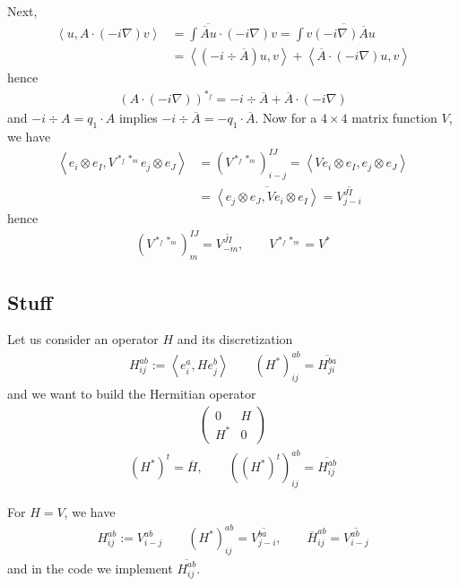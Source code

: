 \documentclass[11pt,a4paper,reqno,french,tikz]{amsart}
\newcommand{\pa}[1]{\left( #1 \right)} %
\newcommand{\ps}[1]{\left< #1 \right>} %
\newcommand{\na}{\nabla} %
\newcommand{\mat}[1]{\begin{pmatrix} #1 \end{pmatrix}} %
\begin{document}
Next, 
\begin{align*}
	\ps{u, A\cdot (-i\na) v} &= \int \overline{\overline{A}u} \cdot (-i\na)v = \int v \overline{(-i\na) \overline{A} u} \\
&= \ps{\pa{-i \div \overline{A}} u,v} + \ps{\overline{A}\cdot (-i\na) u,v}
\end{align*}
hence
\begin{align*}
\pa{A\cdot (-i\na)}^{*_f} = -i \div \overline{A} + \overline{A} \cdot(-i\na)
\end{align*}
and $-i \div A = q_1 \cdot A$ implies $-i\div \overline{A} = -q_1 \cdot \overline{A}$.
Now for a $4 \times 4$ matrix function $V$, we have
\begin{align*}
	\ps{e_i \otimes e_I, V^{*_f *_m} e_j \otimes e_J} &= \pa{V^{*_f *_m}}^{IJ}_{i-j} = \ps{V e_i \otimes e_I, e_j \otimes e_J} \\
&= \overline{\ps{e_j \otimes e_J, V e_i \otimes e_I}} = \overline{V^{JI}_{j-i}}
\end{align*}
hence
\begin{align*}
\pa{V^{*_f *_m}}^{IJ}_{m} = \overline{V^{JI}_{-m}}, \qquad V^{*_f *_m} = V^*
\end{align*}



\subsection{Stuff}%
\label{sub:Stuff}
Let us consider an operator $H$ and its discretization
\begin{align*}
H_{ij}^{ab} := \ps{e_i^a, H e^b_j}\qquad \pa{H^*}^{ab}_{ij} = \overline{H^{ba}_{ji}}
\end{align*}
and we want to build the Hermitian operator
\begin{align*}
	\mat{0 & H \\ H^* & 0}
\end{align*}
\begin{align*}
\pa{H^*}^t = \overline{H}, \qquad \pa{\pa{H^*}^t}^{ab}_{ij} = \overline{H^{ab}_{ij}}
\end{align*}


For $H = V$, we have
\begin{align*}
H_{ij}^{ab} := V^{ab}_{i-j} \qquad \pa{H^*}^{ab}_{ij} = \overline{V^{ba}_{j-i}},\qquad \overline{H}^{ab}_{ij} = \overline{V^{ab}_{i-j}}
\end{align*}
and in the code we implement $\overline{H^{ab}_{ij}}$.
\end{document}
